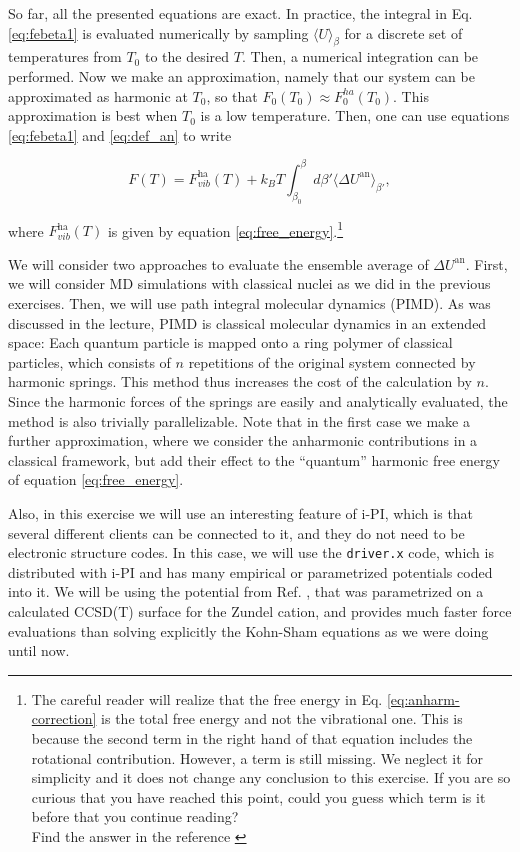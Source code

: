 \documentclass[a4paper,11pt]{scrartcl}
\begin{document}
So far, all the  presented equations are exact. In practice, the integral in Eq. \ref{eq:febeta1} is evaluated numerically by sampling $\langle U \rangle_{\beta}$ for a discrete set of temperatures from $T_0$ to the desired $T$. Then, a numerical integration can be performed. Now we make an approximation, namely that our system can be approximated as harmonic at $T_0$, so that $F_0(T_0) \approx F_0^{ha}(T_0)$. This approximation is best when $T_0$ is a low temperature. Then, one can use equations \ref{eq:febeta1} and \ref{eq:def_an} to write 

\begin{equation}
F(T) = F^{\text{ha}}_{\textit{vib}}(T) + k_B T \int_{\beta_0}^{\beta} d\beta' \langle \Delta U^{\text{an}} \rangle_{\beta'},
\label{eq:anharm-correction}
\end{equation}


\noindent where $F^{\text{ha}}_{\textit{vib}}(T)$ is given by equation \ref{eq:free_energy}.\footnote{The careful reader will realize that the free energy in Eq. \ref{eq:anharm-correction} is the total free energy and not the vibrational one. This is because the second term in the right hand of that equation includes the rotational contribution. However, a term is still missing. We neglect it for simplicity and it does not change any conclusion to this exercise. If you are so curious that you have reached this point, could you guess which term is it before that you continue reading?\\
Find the answer in the reference \cite{answer}  }


 We will consider two approaches to evaluate the ensemble average of $\Delta U^{\text{an}}$.
First, we will consider MD simulations with classical nuclei as we did in the previous exercises. 
Then, we will use path integral molecular dynamics (PIMD). As was discussed in the lecture, PIMD is classical molecular dynamics in an extended space:
Each quantum particle is mapped onto a ring polymer of classical particles, which consists of $n$ repetitions of the original system connected by harmonic springs. This method thus increases the cost of the calculation by $n$. Since the
harmonic forces of the springs are easily and analytically evaluated, the method is also trivially parallelizable.
Note that in the first case we make a further approximation, where we consider the anharmonic contributions
in a classical framework, but add their effect to the ``quantum'' harmonic free energy
of equation \ref{eq:free_energy}.

Also, in this exercise we will use an interesting feature of i-PI, which is that several different clients can be connected to it, and they do 
not need to be electronic structure codes. In this case, we will use the \texttt{driver.x} code, which is distributed with i-PI and has many empirical or parametrized potentials coded into it. We will be using the potential from Ref. \cite{bowman}, that was parametrized on a calculated CCSD(T) surface for the Zundel cation, and provides much faster force evaluations than solving explicitly the Kohn-Sham equations as we were doing until now.
\end{document}
